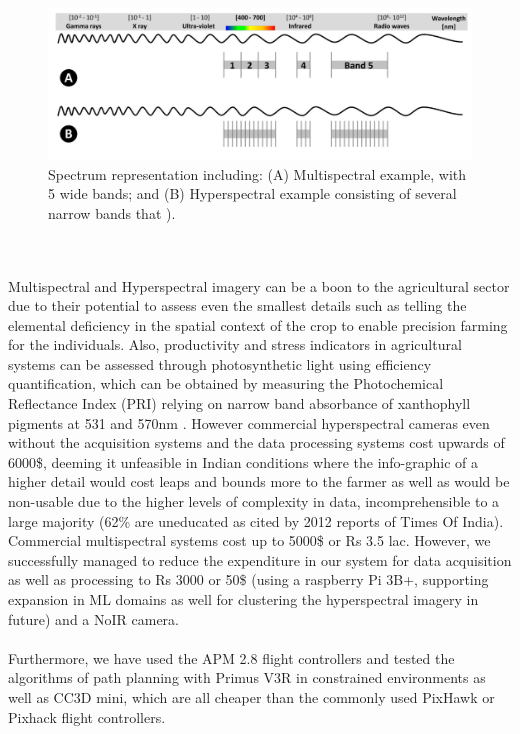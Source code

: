 \begin{figure}[H]
    \centering
    \includegraphics[width=0.7\linewidth]{SummerInterReport/project/Images-Major/em_spectra.png}
    \caption{Spectrum representation including: (A) Multispectral example, with 5 wide bands; and (B) Hyperspectral example consisting of several narrow bands that \cite{fourteen-remotev2}).}
    \label{fig:Concise Flow}
\end{figure}

\\
\\

Multispectral and Hyperspectral imagery can be a boon to the agricultural sector due to their potential to assess even the smallest details such as telling the elemental deficiency in the spatial context of the crop to enable precision farming for the individuals. Also, productivity and stress indicators in agricultural systems can be assessed through photosynthetic light using efficiency quantification, which can be obtained by measuring the Photochemical Reﬂectance Index (PRI) relying on narrow band absorbance of xanthophyll pigments at 531 and 570nm \cite{fifteen-remotev2}.  However commercial hyperspectral cameras even without the acquisition systems and the data processing systems cost upwards of 6000\$, deeming it unfeasible in Indian conditions where the info-graphic of a higher detail would cost leaps and bounds more to the farmer as well as would be non-usable due to the higher levels of complexity in data, incomprehensible to a large majority (62\% are uneducated as cited by 2012 reports of Times Of India\cite{stats3}). Commercial multispectral systems cost up to 5000\$ or Rs 3.5 lac. However, we successfully managed to reduce the expenditure in our system for data acquisition as well as processing to Rs 3000 or 50\$ (using a raspberry Pi 3B+, supporting expansion in ML domains as well for clustering the hyperspectral imagery in future) and a NoIR camera.
\\
\\
Furthermore, we have used the APM 2.8 flight controllers and tested the algorithms of path planning with Primus V3R in constrained environments as well as CC3D mini, which are all cheaper than the commonly used PixHawk or Pixhack flight controllers.



